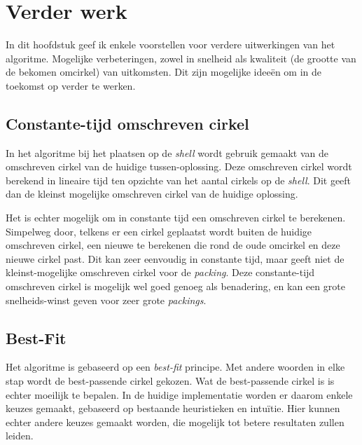 \documentclass[12pt,a4paper,oneside]{book}
\begin{document}
{\chapter{Verder werk} \label{chap:verder-werk}

In dit hoofdstuk geef ik enkele voorstellen voor verdere uitwerkingen van het algoritme.
Mogelijke verbeteringen, zowel in snelheid als kwaliteit (de grootte van de bekomen omcirkel) van uitkomsten. %
Dit zijn mogelijke ideeën om in de toekomst op verder te werken.

\section{Constante-tijd omschreven cirkel}

In het algoritme bij het plaatsen op de \textit{shell} wordt gebruik gemaakt van de omschreven cirkel van de huidige tussen-oplossing.
Deze omschreven cirkel wordt berekend in lineaire tijd ten opzichte van het aantal cirkels op de \textit{shell}.
Dit geeft dan de kleinst mogelijke omschreven cirkel van de huidige oplossing.

Het is echter mogelijk om in constante tijd een omschreven cirkel te berekenen.
Simpelweg door, telkens er een cirkel geplaatst wordt buiten de huidige omschreven cirkel, een nieuwe te berekenen die rond de oude omcirkel en deze nieuwe cirkel past.
Dit kan zeer eenvoudig in constante tijd, maar geeft niet de kleinst-mogelijke omschreven cirkel voor de \textit{packing}.
Deze constante-tijd omschreven cirkel is mogelijk wel goed genoeg als benadering, en kan een grote snelheids-winst geven voor zeer grote \textit{packings}.

\section{Best-Fit}

Het algoritme is gebaseerd op een \textit{best-fit} principe.
Met andere woorden in elke stap wordt de best-passende cirkel gekozen.
Wat de best-passende cirkel is is echter moeilijk te bepalen.
In de huidige implementatie worden er daarom enkele keuzes gemaakt, gebaseerd op bestaande heuristieken en intuïtie.
Hier kunnen echter andere keuzes gemaakt worden, die mogelijk tot betere resultaten zullen leiden.

}
\end{document}
